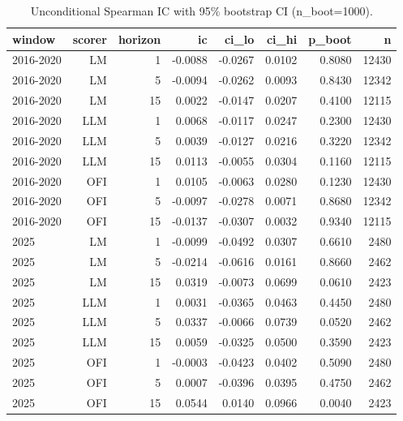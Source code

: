 \begin{table}[htbp]
\centering
\caption{Unconditional Spearman IC with 95\% bootstrap CI (n\_boot=1000).}
\label{tab:unconditional_ic}
\begin{tabular}{lrrrrrrr}
\toprule
window & scorer & horizon & ic & ci\_lo & ci\_hi & p\_boot & n \\
\midrule
2016-2020 & LM & 1 & -0.0088 & -0.0267 & 0.0102 & 0.8080 & 12430 \\
2016-2020 & LM & 5 & -0.0094 & -0.0262 & 0.0093 & 0.8430 & 12342 \\
2016-2020 & LM & 15 & 0.0022 & -0.0147 & 0.0207 & 0.4100 & 12115 \\
2016-2020 & LLM & 1 & 0.0068 & -0.0117 & 0.0247 & 0.2300 & 12430 \\
2016-2020 & LLM & 5 & 0.0039 & -0.0127 & 0.0216 & 0.3220 & 12342 \\
2016-2020 & LLM & 15 & 0.0113 & -0.0055 & 0.0304 & 0.1160 & 12115 \\
2016-2020 & OFI & 1 & 0.0105 & -0.0063 & 0.0280 & 0.1230 & 12430 \\
2016-2020 & OFI & 5 & -0.0097 & -0.0278 & 0.0071 & 0.8680 & 12342 \\
2016-2020 & OFI & 15 & -0.0137 & -0.0307 & 0.0032 & 0.9340 & 12115 \\
2025 & LM & 1 & -0.0099 & -0.0492 & 0.0307 & 0.6610 & 2480 \\
2025 & LM & 5 & -0.0214 & -0.0616 & 0.0161 & 0.8660 & 2462 \\
2025 & LM & 15 & 0.0319 & -0.0073 & 0.0699 & 0.0610 & 2423 \\
2025 & LLM & 1 & 0.0031 & -0.0365 & 0.0463 & 0.4450 & 2480 \\
2025 & LLM & 5 & 0.0337 & -0.0066 & 0.0739 & 0.0520 & 2462 \\
2025 & LLM & 15 & 0.0059 & -0.0325 & 0.0500 & 0.3590 & 2423 \\
2025 & OFI & 1 & -0.0003 & -0.0423 & 0.0402 & 0.5090 & 2480 \\
2025 & OFI & 5 & 0.0007 & -0.0396 & 0.0395 & 0.4750 & 2462 \\
2025 & OFI & 15 & 0.0544 & 0.0140 & 0.0966 & 0.0040 & 2423 \\
\bottomrule
\end{tabular}
\end{table}
